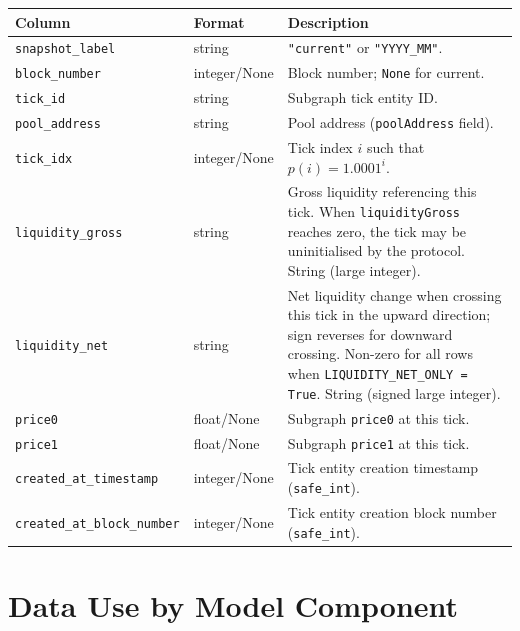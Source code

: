 \documentclass[11pt,a4paper]{article}
\begin{document}
\begin{xltabular}{\linewidth}{L{4.5cm}L{3.0cm}Y}
\toprule
\textbf{Column} & \textbf{Format} & \textbf{Description} \\
\midrule
\texttt{snapshot\_label} & string & \texttt{"current"} or
  \texttt{"YYYY\_MM"}. \\
\texttt{block\_number} & integer/None & Block number; \texttt{None} for
  current. \\
\texttt{tick\_id} & string & Subgraph tick entity ID. \\
\texttt{pool\_address} & string & Pool address (\texttt{poolAddress}
  field). \\
\texttt{tick\_idx} & integer/None & Tick index $i$ such that
  $p(i) = 1.0001^{i}$. \\
\texttt{liquidity\_gross} & string & Gross liquidity referencing this
  tick. When \texttt{liquidityGross} reaches zero, the tick may be
  uninitialised by the protocol. String (large integer). \\
\texttt{liquidity\_net} & string & Net liquidity change when crossing
  this tick in the upward direction; sign reverses for downward crossing.
  Non-zero for all rows when \texttt{LIQUIDITY\_NET\_ONLY = True}.
  String (signed large integer). \\
\texttt{price0} & float/None & Subgraph \texttt{price0} at this tick. \\
\texttt{price1} & float/None & Subgraph \texttt{price1} at this tick. \\
\texttt{created\_at\_timestamp} & integer/None & Tick entity creation
  timestamp (\texttt{safe\_int}). \\
\texttt{created\_at\_block\_number} & integer/None & Tick entity creation
  block number (\texttt{safe\_int}). \\
\bottomrule
\end{xltabular}

\section{Data Use by Model Component}
\label{sec:use}
\end{document}
